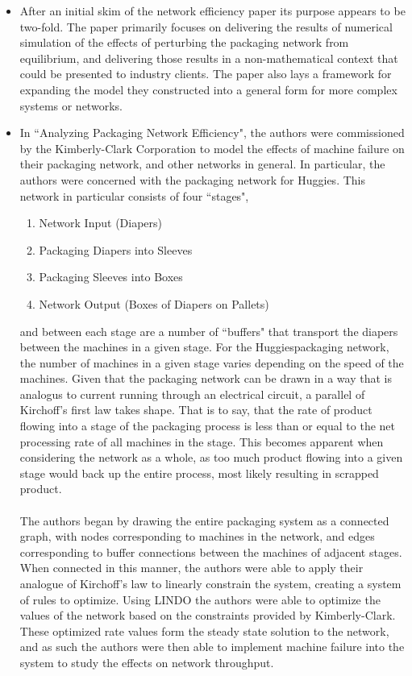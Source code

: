 \documentclass[letterpaper,10pt]{article}
\begin{document}
\begin{itemize}
\item After an initial skim of the network efficiency paper its purpose appears to be two-fold. The paper primarily focuses on delivering the results of numerical simulation of the effects of perturbing the packaging network from equilibrium, and delivering those results in a non-mathematical context that could be presented to industry clients. The paper also lays a framework for expanding the model they constructed into a general form for more complex systems or networks.
\item In ``Analyzing Packaging Network Efficiency", the authors were commissioned by the Kimberly-Clark Corporation to model the effects of machine failure on their packaging network, and other networks in general. In particular, the authors were concerned with the packaging network for Huggies\texttrademark .  This network in particular consists of four ``stages",
\begin{enumerate}
\item Network Input (Diapers)
\item Packaging Diapers into Sleeves
\item Packaging Sleeves into Boxes
\item Network Output (Boxes of Diapers on Pallets)
\end{enumerate}
and between each stage are a number of ``buffers" that transport the diapers between the machines in a given stage. For the Huggies\texttrademark packaging network, the number of machines in a given stage varies depending on the speed of the machines. Given that the packaging network can be drawn in a way that is analogus to current running through an electrical circuit, a parallel of Kirchoff's first law takes shape. That is to say, that the rate of product flowing into a stage of the packaging process is less than or equal to the net processing rate of all machines in the stage. This becomes apparent when considering the network as a whole, as too much product flowing into a given stage would back up the entire process, most likely resulting in scrapped product.\\\\
The authors began by drawing the entire packaging system as a connected graph, with nodes corresponding to machines in the network, and edges corresponding to buffer connections between the machines of adjacent stages. When connected in this manner, the authors were able to apply their analogue of Kirchoff's law to linearly constrain the system, creating a system of rules to optimize. Using LINDO the authors were able to optimize the values of the network based on the constraints provided by Kimberly-Clark. These optimized rate values form the steady state solution to the network, and as such the authors were then able to implement machine failure into the system to study the effects on network throughput.\\\\

\end{itemize}
\end{document}

